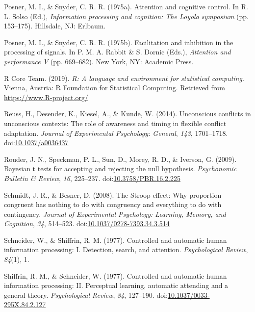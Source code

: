 \documentclass[english,,man,floatsintext]{apa6}
\begin{document}
\leavevmode\hypertarget{ref-posner_attention_1975}{}%
Posner, M. I., \& Snyder, C. R. R. (1975a). Attention and cognitive control. In R. L. Solso (Ed.), \emph{Information processing and cognition: The Loyola symposium} (pp. 153--175). Hillsdale, NJ: Erlbaum.

\leavevmode\hypertarget{ref-posner_facilitation_1975}{}%
Posner, M. I., \& Snyder, C. R. R. (1975b). Facilitation and inhibition in the processing of signals. In P. M. A. Rabbit \& S. Dornic (Eds.), \emph{Attention and performance V} (pp. 669--682). New York, NY: Academic Press.

\leavevmode\hypertarget{ref-r_software_2019}{}%
R Core Team. (2019). \emph{R: A language and environment for statistical computing}. Vienna, Austria: R Foundation for Statistical Computing. Retrieved from \url{https://www.R-project.org/}

\leavevmode\hypertarget{ref-reuss_unconscious_2014}{}%
Reuss, H., Desender, K., Kiesel, A., \& Kunde, W. (2014). Unconscious conflicts in unconscious contexts: The role of awareness and timing in flexible conflict adaptation. \emph{Journal of Experimental Psychology: General}, \emph{143}, 1701--1718. doi:\href{https://doi.org/10.1037/a0036437}{10.1037/a0036437}

\leavevmode\hypertarget{ref-rouder_bayesian_2009}{}%
Rouder, J. N., Speckman, P. L., Sun, D., Morey, R. D., \& Iverson, G. (2009). Bayesian t tests for accepting and rejecting the null hypothesis. \emph{Psychonomic Bulletin \& Review}, \emph{16}, 225--237. doi:\href{https://doi.org/10.3758/PBR.16.2.225}{10.3758/PBR.16.2.225}

\leavevmode\hypertarget{ref-schmidt_stroop_2008}{}%
Schmidt, J. R., \& Besner, D. (2008). The Stroop effect: Why proportion congruent has nothing to do with congruency and everything to do with contingency. \emph{Journal of Experimental Psychology: Learning, Memory, and Cognition}, \emph{34}, 514--523. doi:\href{https://doi.org/10.1037/0278-7393.34.3.514}{10.1037/0278-7393.34.3.514}

\leavevmode\hypertarget{ref-schneider_controlled_1977}{}%
Schneider, W., \& Shiffrin, R. M. (1977). Controlled and automatic human information processing: I. Detection, search, and attention. \emph{Psychological Review}, \emph{84}(1), 1.

\leavevmode\hypertarget{ref-shiffrin_controlled_1977}{}%
Shiffrin, R. M., \& Schneider, W. (1977). Controlled and automatic human information processing: II. Perceptual learning, automatic attending and a general theory. \emph{Psychological Review}, \emph{84}, 127--190. doi:\href{https://doi.org/10.1037/0033-295X.84.2.127}{10.1037/0033-295X.84.2.127}
\end{document}
